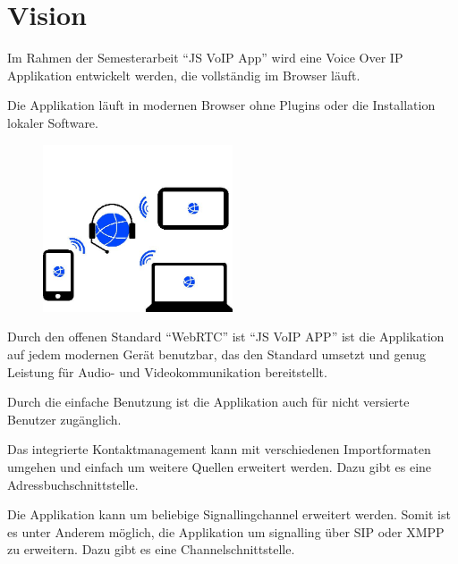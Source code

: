   \chapter{Vision}
	Im Rahmen der Semesterarbeit ``JS VoIP App'' wird eine Voice Over IP Applikation entwickelt werden, die vollständig im Browser läuft.
	
	Die Applikation läuft in modernen Browser ohne Plugins oder die Installation lokaler Software.
			
	\begin{figure}[H]
		\centering
		\includegraphics[width=0.5\textwidth]{../vision/plattformUnabhaengigkeit.jpg}
		\label{plattformUnabhaengigkeit}
	\end{figure}
	
	Durch den offenen Standard ``WebRTC'' ist ``JS VoIP APP'' ist die Applikation auf jedem modernen Gerät benutzbar, das den Standard umsetzt und genug Leistung für Audio- und Videokommunikation bereitstellt.
	
	Durch die einfache Benutzung ist die Applikation auch für nicht versierte Benutzer zugänglich.
	
	Das integrierte Kontaktmanagement kann mit verschiedenen Importformaten umgehen und einfach um weitere Quellen erweitert werden. Dazu gibt es eine Adressbuchschnittstelle.
	
	Die Applikation kann um beliebige Signallingchannel erweitert werden. Somit ist es unter Anderem möglich, die Applikation um signalling über SIP oder XMPP zu erweitern. Dazu gibt es eine Channelschnittstelle.
	
		